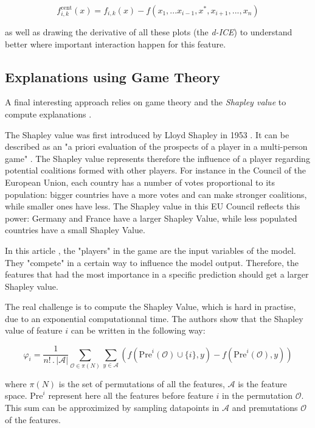 \documentclass[a4paper,11pt]{kth-mag}
\begin{document}
\[
	f^\mathrm{cent}_{i,k}(x) = f_{i,k}(x) - f(x_1, ... x_{i-1}, x^*, x_{i+1}, ..., x_n)
\]

as well as drawing the derivative of all these plots (the \textit{d-ICE}) to understand better where important interaction happen for this feature.

\subsection{Explanations using Game Theory}

A final interesting approach relies on game theory and the \textit{Shapley value} to compute explanations \cite{gametheory}.

The Shapley value was first introduced by Lloyd Shapley in 1953 \cite{shapleyvalue}. It can be described as an "a priori evaluation of the prospects of a player in a multi-person game" \cite{hart1989shapley}. The Shapley value represents therefore the influence of a player regarding potential coalitions formed with other players. For instance in the Council of the European Union, each country has a number of votes proportional to its population: bigger countries have a more votes and can make stronger coalitions, while smaller ones have less. The Shapley value in this EU Council reflects this power: Germany and France have a larger Shapley Value, while less populated countries have a small Shapley Value. 

In this article \cite{gametheory}, the "players" in the game are the input variables of the model. They "compete" in a certain way to influence the model output. Therefore, the features that had the most importance in a specific prediction should get a larger Shapley value.

The real challenge is to compute the Shapley Value, which is hard in practise, due to an exponential computationnal time. The authors show that the Shapley value of feature $i$ can be written in the following way:

\[
	\varphi_i = \frac1{n! \, . \, | \mathcal{A} |} \sum_{\mathcal{O} \in \pi(N)} \sum_{y \in \mathcal{A}} \left( f( \mathrm{Pre}^i(\mathcal{O}) \cup \{i\}, y) - f(\mathrm{Pre}^i(\mathcal{O}), y) \right)
\]

where $\pi(N)$ is the set of permutations of all the features, $\mathcal{A}$ is the feature space. $\mathrm{Pre}^i$ represent here all the features before feature $i$ in the permutation $\mathcal{O}$. This sum can be approximized by sampling datapoints in $\mathcal{A}$ and premutations $\mathcal{O}$ of the features.
\end{document}
